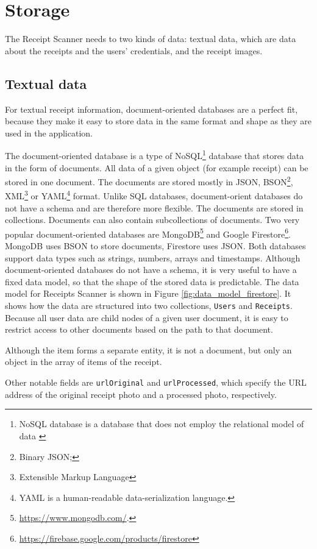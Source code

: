 \documentclass[
  digital, %
  table,   %
  oneside, %
  lof,     %
  lot,     %
]{fithesis3}
\begin{document}
\section{Storage}
The Receipt Scanner needs to two kinds of data: textual data, which are data about the receipts and the users' credentials, and the receipt images. 

\subsection{Textual data}
For textual receipt information, document-oriented databases are a perfect fit, because they make it easy to store data in the same format and shape as they are used in the application. 

The document-oriented database is a type of NoSQL\footnote{NoSQL database is a database that does not employ the relational model of data \cite{DigitalOcean2019Database}} database that stores data in the form of documents. All data of a given object (for example receipt) can be stored in one document. The documents are stored mostly in JSON, BSON\footnote{Binary JSON;}, XML\footnote{Extensible Markup Language} or YAML\footnote{YAML is a human-readable data-serialization language.} format. Unlike SQL databases, document-orient databases do not have a schema and are therefore more flexible. 
The documents are stored in collections. Documents can also contain subcollections of documents.
Two very popular document-oriented databases are MongoDB\footnote{\url{https://www.mongodb.com/}.} and Google Firestore\footnote{\url{https://firebase.google.com/products/firestore}}. MongoDB uses BSON to store documents, Firestore uses JSON. Both databases support data types such as strings, numbers, arrays and timestamps. 
Although document-oriented databases do not have a schema, it is very useful to have a fixed data model, so that the shape of the stored data is predictable. 
The data model for Receipts Scanner is shown in Figure \ref{fig:data_model_firestore}. It shows how the data are structured into two collections, \texttt{Users} and \texttt{Receipts}. Because all user data are child nodes of a given user document, it is easy to restrict access to other documents based on the path to that document.

Although the item forms a separate entity, it is not a document, but only an object in the array of items of the receipt.

Other notable fields are \texttt{urlOriginal} and \texttt{urlProcessed}, which specify the URL address of the original receipt photo and a processed photo, respectively. 
\end{document}
